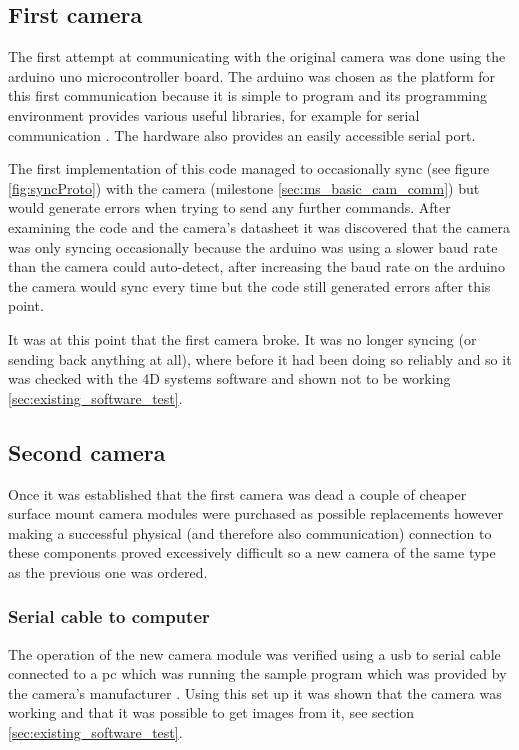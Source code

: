 \subsection{First camera}

The first attempt at communicating with the original camera was done using the arduino uno microcontroller board. The arduino was chosen as the platform for this first communication because it is simple to program and its programming environment provides various useful libraries, for example for serial communication \cite{arduino_serial_library}. The hardware also provides an easily accessible serial port.

The first implementation of this code managed to occasionally sync (see figure \ref{fig:syncProto}) with the camera (milestone \ref{sec:ms_basic_cam_comm}) but would generate errors when trying to send any further commands. After examining the code and the camera's datasheet it was discovered that the camera was only syncing occasionally because the arduino was using a slower baud rate than the camera could auto-detect, after increasing the baud rate on the arduino the camera would sync every time but the code still generated errors after this point.

It was at this point that the first camera broke. It was no longer syncing (or sending back anything at all), where before it had been doing so reliably and so it was checked with the 4D systems software and shown not to be working \ref{sec:existing_software_test}.

\subsection{Second camera}

Once it was established that the first camera was dead a couple of cheaper surface mount camera modules were purchased as possible replacements however making a successful physical (and therefore also communication) connection to these components proved excessively difficult so a new camera of the same type as the previous one \cite{ucam_datasheet} was ordered.

\subsubsection{Serial cable to computer}

The operation of the new camera module was verified using a usb to serial cable connected to a pc which was running the sample program which was provided by the camera's manufacturer \cite{ucam_test_software}. Using this set up it was shown that the camera was working and that it was possible to get images from it, see section \ref{sec:existing_software_test}.

